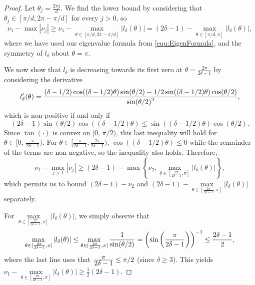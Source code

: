 \begin{proof}

Let $\theta_j = \frac{2 \pi j}{d}$.  We find the lower bound by considering that $\theta_j \in [\pi / d, 2\pi - \pi / d]$ for every $j > 0$, so 
\[\nu_1 - \max | \nu_j | \ge \nu_1 - \max_{\theta \in [\pi / d, 2\pi - \pi / d]} | l_\delta(\theta) | = (2 \delta - 1) - \max_{\theta \in [\pi / d, \pi]} | l_\delta(\theta) |,\]where we have used our eigenvalue formula from \eqref{equ:EigenFormula}, and the symmetry of $l_\delta$ about $\theta = \pi$.

We now show that $l_\delta$ is decreasing towards its first zero at $\theta = \frac{2 \pi}{2 \delta - 1}$ by considering the derivative \[l_\delta'(\theta) = \frac{\displaystyle (\delta - 1/2)\cos((\delta - 1/2)\theta) \sin(\theta/2) - 1/2 \sin((\delta - 1/2)\theta) \cos(\theta / 2)}{\displaystyle \sin(\theta / 2) ^ 2},\] which is non-positive if and only if \[(2\delta - 1) \sin(\theta/2)\cos((\delta - 1/2)\theta)  \le  \sin((\delta - 1/2)\theta) \cos(\theta /2 ).\]  Since $\tan(\cdot)$ is convex on $[0,\, \pi / 2)$, this last inequality will hold for $\theta \in [0,\, \frac{\pi}{2\delta - 1})$.  For $\theta \in [\frac{\pi}{2\delta-1}, \frac{2\pi}{2\delta -1})$, $\cos((\delta - 1/2)\theta) \leq 0$ while the remainder of the terms are non-negative, so the inequality also holds.  Therefore,
\[\nu_1 - \max_{j > 1} |\nu_j| \ge (2 \delta - 1) - \max \left\{\nu_2, \max_{\theta \in [\frac{2\pi}{2\delta-1}, \pi]} |l_\delta(\theta)| \right\},\]
which permits us to bound $(2 \delta - 1) - \nu_2$ and $(2 \delta - 1) - \max\limits_{\theta \in [\frac{2\pi}{2\delta-1}, \pi]} |l_\delta(\theta)|$ separately.

For $\max\limits_{\theta \in [\frac{2\pi}{2\delta-1}, \pi]} |l_\delta(\theta)|$, we simply observe that \[\max\limits_{\theta \in [\frac{2\pi}{2\delta-1}, \pi]} |l_\delta(\theta)| \le \max\limits_{\theta \in [\frac{2\pi}{2\delta-1}, \pi]} \dfrac{1}{\sin(\theta / 2)} = \left( \sin \left(\frac{\pi}{2\delta - 1} \right) \right)^{-1}  \le \frac{\displaystyle 2\delta - 1}{\displaystyle 2},\] where the last line uses that $\frac{\displaystyle \pi}{\displaystyle 2\delta - 1} \le \pi / 2$ (since $\delta \ge 3$).  This yields $\nu_1 - \max\limits_{\theta \in [\frac{2\pi}{2\delta-1}, \pi]} |l_\delta(\theta)| \ge \frac{1}{2}(2 \delta - 1)$.


\end{proof}

